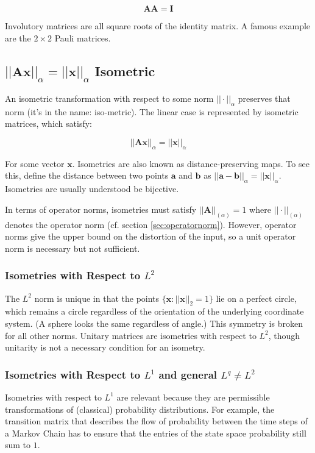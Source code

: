 \begin{equation}
\mathbf{A}\mathbf{A}=\mathbf{I}
\end{equation}

Involutory matrices are all square roots of the identity matrix. A famous example are the $2\times 2$ Pauli matrices. 




\subsection{$||\mathbf{A}\mathbf{x}||_{\alpha} = ||\mathbf{x}||_{\alpha}$ Isometric}
\label{sec:isometric}
An isometric transformation with respect to some norm $||\cdot||_{\alpha}$ preserves that norm (it's in the name: iso-metric). The linear case is represented by isometric matrices, which satisfy:

\begin{equation}
||\mathbf{A}\mathbf{x}||_{\alpha} = ||\mathbf{x}||_{\alpha} 
\end{equation}

For some vector $\mathbf{x}$. Isometries are also known as distance-preserving maps. To see this, define the distance between two points $\mathbf{a}$ and $\mathbf{b}$ as $||\mathbf{a} - \mathbf{b}||_{\alpha} = ||\mathbf{x}||_{\alpha}$. Isometries are usually understood be bijective. 

In terms of operator norms, isometries must satisfy $||\mathbf{A}||_{(\alpha)} = 1$ where $||\cdot||_{(\alpha)}$ denotes the operator norm (cf. section \ref{sec:operatornorm}). However, operator norms give the upper bound on the distortion of the input, so a unit operator norm is necessary but not sufficient. 


\subsubsection{Isometries with Respect to $L^2$}
The $L^2$ norm is unique in that the points $\{\mathbf{x}: ||\mathbf{x}||_{2} = 1\}$ lie on a perfect circle, which remains a circle regardless of the orientation of the underlying coordinate system. (A sphere looks the same regardless of angle.) This symmetry is broken for all other norms. Unitary matrices are isometries with respect to $L^2$, though unitarity is not a necessary condition for an isometry.

\subsubsection{Isometries with Respect to $L^1$ and general $L^q\neq L^2$}
Isometries with respect to $L^1$ are relevant because they are permissible transformations of (classical) probability distributions. For example, the transition matrix that describes the flow of probability between the time steps of a Markov Chain has to ensure that the entries of the state space probability still sum to $1$. 

